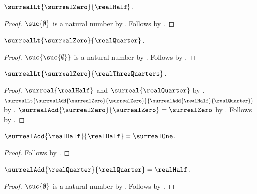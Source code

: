 \begin{proposition}\label{real_half_positive}
    $\surrealLt{\surrealZero}{\realHalf}$.
\end{proposition}
\begin{proof}
    $\suc{\emptyset}$ is a natural number by .
    Follows by .
\end{proof}

\begin{proposition}\label{real_quarter_positive}
    $\surrealLt{\surrealZero}{\realQuarter}$.
\end{proposition}
\begin{proof}
    $\suc{\suc{\emptyset}}$ is a natural number
        by .
    Follows by .
\end{proof}

\begin{proposition}\label{real_three_quarters_positive}
    $\surrealLt{\surrealZero}{\realThreeQuarters}$.
\end{proposition}
\begin{proof}
    $\surreal{\realHalf}$ and $\surreal{\realQuarter}$
        by
        .
    $\surrealLt{\surrealAdd{\surrealZero}{\surrealZero}}
        {\surrealAdd{\realHalf}{\realQuarter}}$
        by
        .
    $\surrealAdd{\surrealZero}{\surrealZero}=\surrealZero$
        by .
    Follows by .
\end{proof}

\begin{proposition}\label{real_half_plus_half_eq_one}
    $\surrealAdd{\realHalf}{\realHalf}=\surrealOne$.
\end{proposition}
\begin{proof}
    Follows by
        .
\end{proof}

\begin{proposition}\label{real_quarter_plus_quarter_eq_half}
    $\surrealAdd{\realQuarter}{\realQuarter}=\realHalf$.
\end{proposition}
\begin{proof}
    $\suc{\emptyset}$ is a natural number by .
    Follows by
        .
\end{proof}

